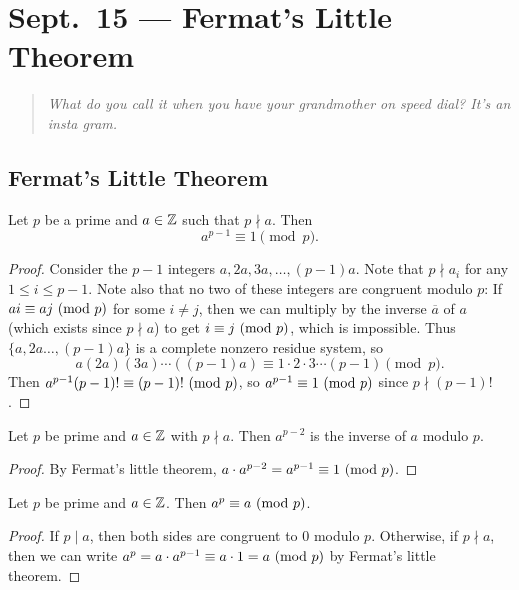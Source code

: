 \chapter{Sept.~15 --- Fermat's Little Theorem}

\begin{quote}
  \emph{What do you call it when you have
  your grandmother on speed dial?
  It's an insta gram.}
\end{quote}

\section{Fermat's Little Theorem}

\begin{theorem}
  Let $p$ be a prime and $a \in \mathbb{Z}$
  such that $p \nmid a$. Then
  \[
    a^{p - 1} \equiv 1 \pmod{p}.
  \]
\end{theorem}

\begin{proof}
  Consider the $p - 1$ integers
  $a, 2a, 3a, \dots, (p - 1)a$. Note that
  $p \nmid a_i$ for any $1 \le i \le p - 1$.
  Note also that no two of these integers
  are congruent modulo $p$: If $a i \equiv a j \ (\mathrm{mod}\ p)$
  for some $i \ne j$, then we
  can multiply by the inverse $\overline{a}$
  of $a$ (which exists since $p \nmid a$)
  to get $i \equiv j \ (\mathrm{mod}\ p)$, which
  is impossible.
  Thus $\{a, 2a \dots, (p - 1)a\}$ is a
  complete nonzero residue system, so
  \[
    a(2a)(3a) \cdots ((p - 1)a)
    \equiv 1 \cdot 2 \cdot 3 \cdots (p - 1)
    \pmod{p}.
  \]
  Then $a^{p - 1}(p - 1)! \equiv (p - 1)! \ (\mathrm{mod}\ p)$, so
  $a^{p - 1} \equiv 1 \ (\mathrm{mod}\ p)$
  since $p \nmid (p - 1)!$.
\end{proof}

\begin{corollary}
  Let $p$ be prime and $a \in \mathbb{Z}$ with
  $p \nmid a$. Then
  $a^{p - 2}$ is the inverse of $a$
  modulo $p$.
\end{corollary}

\begin{proof}
  By Fermat's little theorem,
  $a \cdot a^{p - 2} = a^{p - 1} \equiv 1 \ (\mathrm{mod}\ p)$.
\end{proof}

\begin{corollary}
  Let $p$ be prime and $a \in \mathbb{Z}$.
  Then $a^p \equiv a \ (\mathrm{mod}\ p)$.
\end{corollary}

\begin{proof}
  If $p \mid a$, then both
  sides are congruent to
  $0$ modulo $p$. Otherwise, if
  $p \nmid a$, then we can write
  $a^p = a \cdot a^{p - 1} \equiv a \cdot 1 = a \ (\mathrm{mod}\ p)$
  by Fermat's little theorem.
\end{proof}

